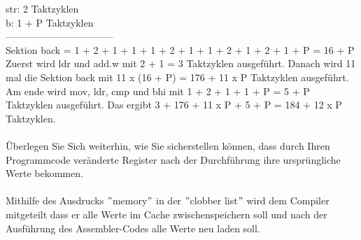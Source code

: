 str: 2 Taktzyklen\\
b: 1 + P Taktzyklen\\
---------------------------------\\
Sektion back = 1 + 2 + 1 + 1 + 1 + 2 + 1 + 1 + 2 + 1 + 2 + 1 + P = 16 + P\\
Zuerst wird ldr und add.w mit 2 + 1 = 3 Taktzyklen ausgeführt. Danach wird 11 mal die Sektion back mit 11 x (16 + P) = 176 + 11 x P Taktzyklen ausgeführt. Am ende wird mov, ldr, cmp und bhi mit 1 + 2 + 1 + 1 + P = 5 + P  Taktzyklen ausgeführt. Das ergibt 3 + 176 + 11 x P + 5 + P = 184 + 12 x P Taktzyklen.\\ \\
Überlegen Sie Sich weiterhin, wie Sie sicherstellen können, dass durch Ihren Programmcode veränderte Register nach der Durchführung ihre ursprüngliche Werte bekommen.\\ \\
Mithilfe des Ausdrucks $"$memory$"$ in der $"$clobber list$"$ wird dem Compiler mitgeteilt dass er alle Werte im Cache zwischenspeichern soll und nach der Ausführung des Assembler-Codes alle Werte neu laden soll.\\ \\
